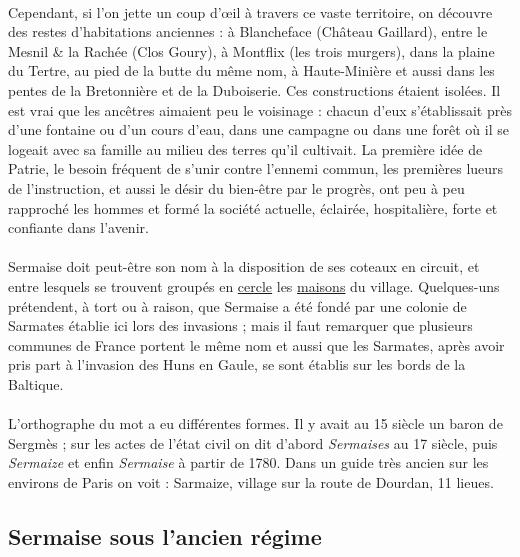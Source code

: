 \documentclass[../eBook.tex]{subfiles}
\begin{document}
    \paragraph{}Cependant, si l'on jette un coup d'\oe il à travers ce vaste territoire, on découvre des restes d'habitations anciennes : à Blancheface (Château Gaillard), entre le Mesnil \& la Rachée (Clos Goury), à Montflix (les trois murgers), dans la plaine du Tertre, au pied de la butte du même nom, à Haute-Minière et aussi dans les pentes de la Bretonnière et de la Duboiserie. Ces constructions étaient isolées. Il est vrai que les ancêtres aimaient peu le voisinage : chacun d'eux s'établissait près d'une fontaine ou d'un cours d'eau, dans une campagne ou dans une forêt où il se logeait avec sa famille au milieu des terres qu'il cultivait. La première idée de Patrie, le besoin fréquent de s'unir contre l'ennemi commun, les premières lueurs de l'instruction, et aussi le désir du bien-être par le progrès, ont peu à peu rapproché les hommes et formé la société actuelle, éclairée, hospitalière, forte et confiante dans l'avenir.

    \vspace{12pt}
    \noindent\dotfill
    \paragraph{}Sermaise doit peut-être son nom à la disposition de ses coteaux en circuit, et entre lesquels se trouvent groupés en \underline{cercle} les \underline{maisons} du village. Quelques-uns prétendent, à tort ou à raison, que Sermaise a été fondé par une colonie de Sarmates établie ici lors des invasions ; mais il faut remarquer que plusieurs communes de France portent le même nom et aussi que les Sarmates, après avoir pris part à l'invasion des Huns en Gaule, se sont établis sur les bords de la Baltique.
    \paragraph{}L'orthographe du mot a eu différentes formes. Il y avait au 15 siècle un baron de Sergmès ; sur les actes de l'état civil on dit d'abord \og \textit{Sermaises} \fg{} au 17 siècle, puis \og \textit{Sermaize} \fg{} et enfin \og \textit{Sermaise} \fg{} à partir de 1780. Dans un guide très ancien sur les environs de Paris on voit : Sarmaize, village sur la route de Dourdan, 11 lieues.

  \subsection*{Sermaise sous l'ancien régime}
\end{document}
